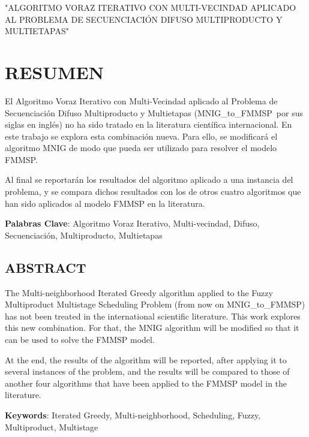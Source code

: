 \documentclass{article}
\def\algmod{MNIG\_to\_FMMSP} %
\begin{document}
"ALGORITMO VORAZ ITERATIVO CON MULTI-VECINDAD APLICADO AL PROBLEMA DE
SECUENCIACIÓN DIFUSO MULTIPRODUCTO Y \linebreak MULTIETAPAS"

\newpage

\section{RESUMEN}

El Algoritmo Voraz Iterativo con Multi-Vecindad aplicado al Problema de
Secuenciación Difuso Multiproducto y Multietapas (\algmod\ por sus siglas
en inglés) no ha sido tratado en la literatura científica internacional.
En este trabajo se explora esta combinación nueva. Para ello, se modificará
el algoritmo MNIG de modo que pueda ser utilizado para resolver el modelo FMMSP.

\vspace{\baselineskip}
Al final se reportarán los resultados del algoritmo aplicado a una instancia
del problema, y se compara dichos resultados con los de otros cuatro algoritmos 
que han sido aplicados al modelo FMMSP en la literatura.

\vspace{\baselineskip}
\textbf{Palabras Clave}: Algoritmo Voraz Iterativo, Multi-vecindad,
Difuso, Secuenciación, Multiproducto, Multietapas

\subsection{ABSTRACT}

The Multi-neighborhood Iterated Greedy algorithm applied to the Fuzzy 
Multiproduct Multistage Scheduling Problem (from now on \algmod)
has not been treated in the international scientific literature. This
work explores this new combination. For that, the MNIG algorithm will be
modified so that it can be used to solve the FMMSP model.

\vspace{\baselineskip}
At the end, the results of the algorithm will be reported, after applying it to 
several instances of the problem, and the results will be compared to those of 
another four algorithms that have been applied to the FMMSP model in the 
literature. 

\vspace{\baselineskip}
\par \textbf{Keywords}: Iterated Greedy, Multi-neighborhood, Scheduling, Fuzzy,
Multiproduct, Multistage
\end{document}
